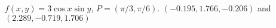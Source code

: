 {$f(x,y) = 3\cos x\sin y$,   $P=(\pi/3, \pi/6)$.
}
{
$(-0.195,1.766,-0.206)$ and $(2.289,-0.719, 1.706)$ 
}